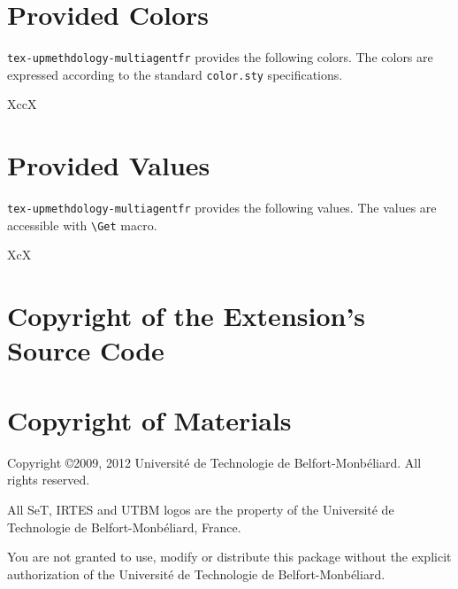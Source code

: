 \documentclass[article]{upmethodology-document}
\gdef\upmextensiondoccolorlist{}
\gdef\upmextensiondocvaluelist{}
\begin{document}
\section{Provided Colors}

\texttt{tex-upmethdology-multiagentfr} provides the following colors. The colors are expressed according to the standard \texttt{color.sty} specifications.

\begin{mtabular}{4}{XccX}
\upmextensiondoccolorlist
\end{mtabular}

\section{Provided Values}

\texttt{tex-upmethdology-multiagentfr} provides the following values. The values are accessible with \texttt{{\textbackslash}Get} macro.

\begin{mtabular}{3}{XcX}
\upmextensiondocvaluelist
\end{mtabular}

\section{Copyright of the Extension's Source Code}



\section{Copyright of Materials}

Copyright \copyright 2009, 2012 Universit\'e de Technologie de Belfort-Monb\'eliard. All rights reserved.

All SeT, IRTES and UTBM logos are the property of the Universit\'e de Technologie de Belfort-Monb\'eliard, France.

You are not granted to use, modify or distribute this package without the explicit authorization of the Universit\'e de Technologie de Belfort-Monb\'eliard.
\end{document}
